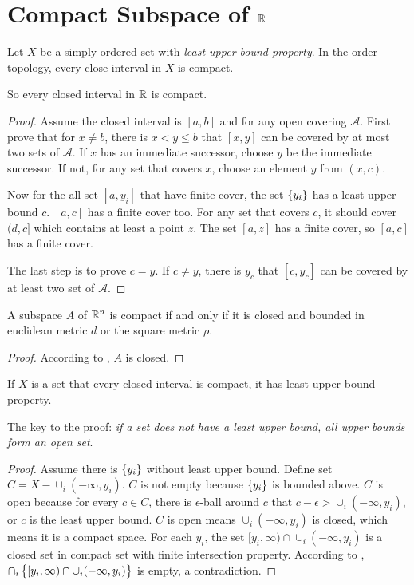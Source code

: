 
\section{Compact Subspace of $\mathbb{R}$}

\begin{theorem}
    Let $X$ be a simply ordered set with \emph{least upper bound property}. In the order topology, every close interval in $X$ is compact. 
    
    So every closed interval in $\mathbb{R}$ is compact.
\end{theorem}
\begin{proof}
    Assume the closed interval is $[a,b]$ and for any open covering $\mathcal{A}$. First prove that for $x \neq b$, there is $x < y \leq b$ that $[x,y]$ can be covered by at most two sets of $\mathcal{A}$. If $x$ has an immediate successor, choose $y$ be the immediate successor. If not, for any set that covers $x$, choose an element $y$ from $(x,c)$.
    
    Now for the all set $[a,y_i]$ that have finite cover, the set $\set{y_i}$ has a least upper bound $c$. $[a,c]$ has a finite cover too. For any set that covers $c$, it should cover $(d,c]$ which contains at least a point $z$. The set $[a,z]$ has a finite cover, so $[a,c]$ has a finite cover.
    
    The last step is to prove $c = y$. If $c \neq y$, there is $y_c$ that $[c, y_c]$ can be covered by at least two set of $\mathcal{A}$.
\end{proof}

\begin{theorem}
    A subspace $A$ of $\mathbb{R}^n$ is compact if and only if it is closed and bounded in euclidean metric $d$ or the square metric $\rho$.    
\end{theorem}
\begin{proof}
    According to , $A$ is closed.
\end{proof}

\begin{theorem}
    If $X$ is a set that every closed interval is compact, it has least upper bound property.    
    
    The key to the proof: \emph{if a set does not have a least upper bound, all upper bounds form an open set}.
\end{theorem}
\begin{proof}
    Assume there is $\set{y_i}$ without least upper bound. Define set $C = X - \cup_i (-\infty,y_i)$. $C$ is not empty because $\set{y_i}$ is bounded above. $C$ is open because for every $c\in C$, there is $\epsilon$-ball around $c$ that $c-\epsilon > \cup_i (-\infty,y_i)$, or $c$ is the least upper bound. $C$ is open means $\cup_i (-\infty,y_i)$ is closed, which means it is a compact space. For each $y_i$, the set $[y_i, \infty) \cap \cup_i (-\infty,y_i)$ is a closed set in compact set with finite intersection property. According to , $\cap_i \set{[y_i, \infty) \cap \cup_i (-\infty,y_i)}$ is empty, a contradiction.
\end{proof}




